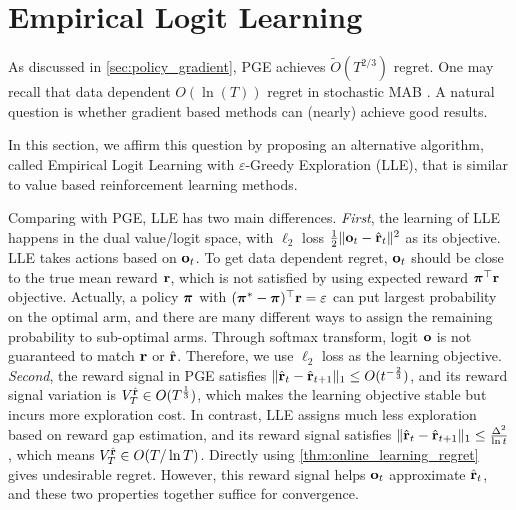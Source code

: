 \section{Empirical Logit Learning}
\label{sec:logit_learning}

As discussed in \cref{sec:policy_gradient}, PGE achieves $\tilde{O}(T^{2/3})$ regret. One may recall that data dependent $O(\ln(T))$ regret in stochastic MAB \citep{bubeck2012regret}. A natural question is whether gradient based methods can (nearly) achieve good results.

In this section, we affirm this question by proposing an alternative algorithm, called Empirical Logit Learning with $\varepsilon$-Greedy Exploration (LLE), that is similar to value based reinforcement learning methods.

Comparing with PGE, LLE has two main differences. \textit{First}, the learning of LLE happens in the dual value/logit space, with $\ell_2$ loss $\frac{1}{2} \| {\mathbf{o}}_t - \hat{{\mathbf{r}}}_t \|^2$ as its objective. LLE takes actions based on ${\mathbf{o}}_t$. To get data dependent regret, ${\mathbf{o}}_t$ should be close to the true mean reward ${\mathbf{r}}$, which is not satisfied by using expected reward ${\boldsymbol{\pi}}^\top {\mathbf{r}}$ objective. Actually, a policy ${\boldsymbol{\pi}}$ with $({\boldsymbol{\pi}}^* - {\boldsymbol{\pi}})^\top {\mathbf{r}} = \varepsilon$ can put largest probability on the optimal arm, and there are many different ways to assign the remaining probability to sub-optimal arms. Through softmax transform, logit ${\mathbf{o}}$ is not guaranteed to match ${\mathbf{r}}$ or $\hat{{\mathbf{r}}}$. Therefore, we use $\ell_2$ loss as the learning objective. \textit{Second}, the reward signal in PGE satisfies $\| \hat{{\mathbf{r}}}_t  - \hat{{\mathbf{r}}}_{t+1} \|_1 \le O(t^{-\frac{2}{3}})$, and its reward signal variation is $V_T^{\hat{{\mathbf{r}}}} \in O(T^{\frac{1}{3}})$, which makes the learning objective stable but incurs more exploration cost. In contrast, LLE assigns much less exploration based on reward gap estimation, and its reward signal satisfies $\| \hat{{\mathbf{r}}}_t - \hat{{\mathbf{r}}}_{t+1} \|_1 \le \frac{\Delta^2}{\ln{t}}$, which means $V_T^{\hat{{\mathbf{r}}}} \in O(T/\ln{T})$. Directly using \cref{thm:online_learning_regret} gives undesirable regret. However, this reward signal helps ${\mathbf{o}}_t$ approximate $\hat{{\mathbf{r}}}_t$, and these two properties together suffice for convergence.

